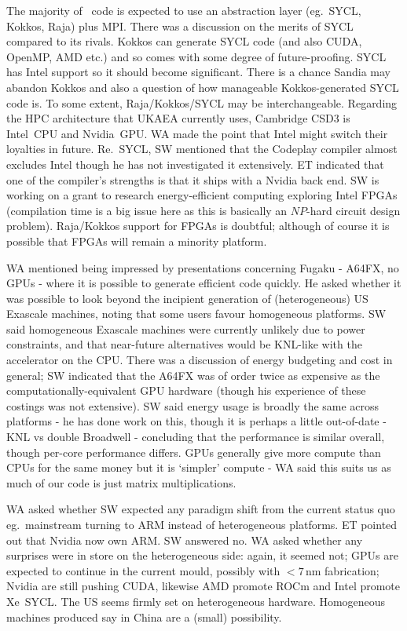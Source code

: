 The majority of \nep \  code is expected to use an 
abstraction layer (eg.\ SYCL, Kokkos, Raja) plus MPI.
There was a discussion on the merits of SYCL compared to its rivals. 
Kokkos can generate SYCL code (and 
also CUDA, OpenMP, AMD etc.) and so comes with some degree of future-proofing.  
SYCL has Intel support so it should become significant.  There is a chance 
Sandia may abandon Kokkos and also a question of how manageable Kokkos-generated 
SYCL code is.  To some extent, Raja/Kokkos/SYCL may be interchangeable.  Regarding
the HPC architecture that UKAEA currently uses, Cambridge CSD3 is Intel~CPU and 
Nvidia~GPU.  WA made the point that Intel might switch their loyalties in 
future.  Re.\ SYCL, SW mentioned that the Codeplay compiler almost excludes Intel 
though he has not investigated it extensively. 
ET indicated that  one of the compiler's strengths is that it ships with a Nvidia back end.
SW is working on a grant to research 
energy-efficient computing exploring Intel FPGAs (compilation time is a 
big issue here as this is basically an $NP$-hard circuit design problem). 
Raja/Kokkos support for FPGAs is doubtful; although of course it is possible that FPGAs 
will remain a minority platform.

WA mentioned being impressed by presentations concerning Fugaku  - A64FX, no 
GPUs - where it is possible to generate efficient code quickly.  He asked 
whether it was possible to look beyond the incipient generation of 
(heterogeneous) US Exascale machines, noting that some users favour homogeneous 
platforms.  SW said homogeneous Exascale machines were currently unlikely due 
to power constraints, and that near-future alternatives would be KNL-like with 
the accelerator on the CPU.  There was a discussion of energy budgeting and 
cost in general; SW indicated that the A64FX was of order twice as expensive as 
the computationally-equivalent GPU hardware (though his experience of these 
costings was not extensive).  SW said energy usage is broadly the same across 
platforms - he has done work on this, though it is perhaps a little out-of-date 
- KNL vs double Broadwell - concluding that the performance is similar overall, 
though per-core performance differs.  GPUs generally give more compute than 
CPUs for the same money but it is `simpler' compute - WA said this suits us as 
much of our code is just matrix multiplications. 

WA asked whether SW expected 
any paradigm shift from the current status quo eg.\ mainstream turning to ARM 
instead of heterogeneous platforms. ET pointed out that  Nvidia now own ARM.  SW answered 
no.  WA asked whether any surprises were in store on the heterogeneous side: 
again, it seemed not; GPUs are expected to continue in the current mould, 
possibly with $<7$\,nm fabrication; Nvidia are still pushing CUDA, likewise AMD promote
ROCm and Intel promote Xe~SYCL.  The US seems firmly set on heterogeneous hardware.
Homogeneous machines produced say in China are a (small) possibility.

